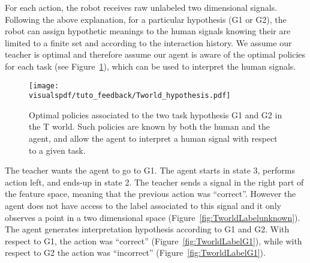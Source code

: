 For each action, the robot receives raw unlabeled two dimensional signals. Following the above explanation, for a particular hypothesis (G1 or G2), the robot can assign hypothetic meanings to the human signals knowing their are limited to a finite set and according to the interaction history. We assume our teacher is optimal and therefore assume our agent is aware of the optimal policies for each task  (see Figure~\ref{fig:Twolrdpolicies}), which can be used to interpret the human signals.



\begin{figure}[!htbp]
  \centering
  \texttt{[image: \\visualspdf/tuto\_feedback/Tworld\_hypothesis.pdf]}
  \caption{Optimal policies associated to the two task hypothesis G1 and G2 in the T world. Such policies are known by both the human and the agent, and allow the agent to interpret a human signal with respect to a given task.}
  \label{fig:Twolrdpolicies}
\end{figure}

The teacher wants the agent to go to G1. The agent starts in state 3, performs action left, and ends-up in state 2. The teacher sends a signal in the right part of the feature space, meaning that the previous action was ``correct''. However the agent does not have access to the label associated to this signal and it only observes a point in a two dimensional space (Figure~\ref{fig:TworldLabelunknown}). The agent generates interpretation hypothesis according to G1 and G2. With respect to G1, the action was ``correct'' (Figure~\ref{fig:TworldLabelG1}), while with respect to G2 the action was ``incorrect'' (Figure~\ref{fig:TworldLabelG1}).

